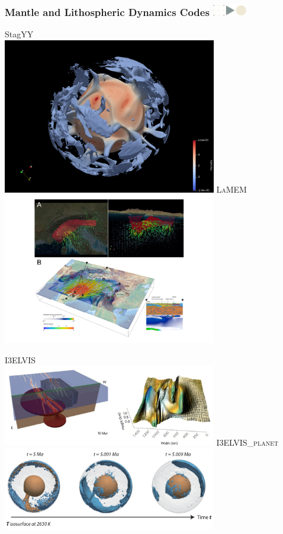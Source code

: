 \documentclass{beamer}
\newcommand\frametitlelogo[1]{\frametitle{#1\hspace{0pt plus 1 filll} \includegraphics[width=42pt]{logo_slides}}}
\newcommand{\StagYY}{StagYY}
\begin{document}
\begin{frame}[fragile]
\frametitlelogo{Mantle and Lithospheric Dynamics Codes}
\begin{minipage}{0.49\textwidth}
\StagYY{} \\
  \includegraphics[width=0.7\textwidth]{images/martina_1_placeholder.png}
\textsc{LaMEM}\footnotemark\\
\includegraphics[width=0.7\textwidth]{images/kausB.pdf}
\end{minipage}
\begin{minipage}{0.49\textwidth}
\textsc{I3ELVIS}\footnotemark\\
\includegraphics[width=0.7\textwidth]{images/ngeo.png}
\textsc{I3ELVIS\_planet} \footnotemark\\
\includegraphics[width=0.7\textwidth]{images/gregor.png}\\

\end{minipage}
\end{frame}
\end{document}
